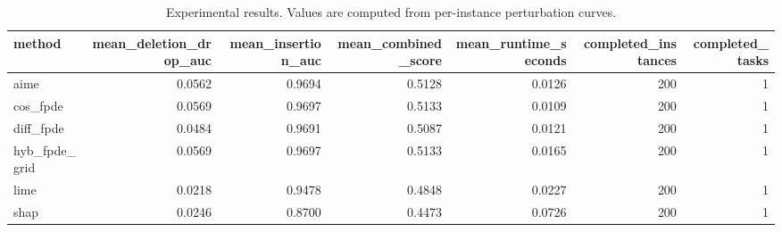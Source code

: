 \begin{table}[t]
\caption{Experimental results. Values are computed from per-instance perturbation curves.}
\label{tab:main_results_computed}
\centering
\begin{tabular}{lrrrrrr}
\toprule
method & mean\_deletion\_drop\_auc & mean\_insertion\_auc & mean\_combined\_score & mean\_runtime\_seconds & completed\_instances & completed\_tasks \\
\midrule
aime & 0.0562 & 0.9694 & 0.5128 & 0.0126 & 200 & 1 \\
cos\_fpde & 0.0569 & 0.9697 & 0.5133 & 0.0109 & 200 & 1 \\
diff\_fpde & 0.0484 & 0.9691 & 0.5087 & 0.0121 & 200 & 1 \\
hyb\_fpde\_grid & 0.0569 & 0.9697 & 0.5133 & 0.0165 & 200 & 1 \\
lime & 0.0218 & 0.9478 & 0.4848 & 0.0227 & 200 & 1 \\
shap & 0.0246 & 0.8700 & 0.4473 & 0.0726 & 200 & 1 \\
\bottomrule
\end{tabular}

\end{table}
